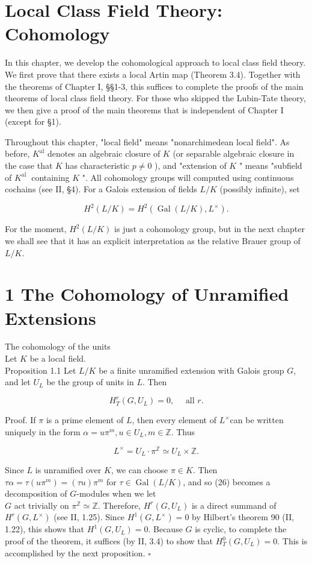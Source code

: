 \documentclass[10pt]{article}
\begin{document}
\section*{Local Class Field Theory: Cohomology}
In this chapter, we develop the cohomological approach to local class field theory. We first prove that there exists a local Artin map (Theorem 3.4). Together with the theorems of Chapter I, §§1-3, this suffices to complete the proofs of the main theorems of local class field theory. For those who skipped the Lubin-Tate theory, we then give a proof of the main theorems that is independent of Chapter I (except for §1).

Throughout this chapter, "local field" means "nonarchimedean local field". As before, $K^{\mathrm{al}}$ denotes an algebraic closure of $K$ (or separable algebraic closure in the case that $K$ has characteristic $p \neq 0$ ), and "extension of $K$ " means "subfield of $K^{\text {al }}$ containing $K$ ". All cohomology groups will computed using continuous cochains (see II, §4). For a Galois extension of fields $L / K$ (possibly infinite), set

$$
H^{2}(L / K)=H^{2}\left(\operatorname{Gal}(L / K), L^{\times}\right) .
$$

For the moment, $H^{2}(L / K)$ is just a cohomology group, but in the next chapter we shall see that it has an explicit interpretation as the relative Brauer group of $L / K$.

\section*{1 The Cohomology of Unramified Extensions}
The cohomology of the units\\
Let $K$ be a local field.\\
Proposition 1.1 Let $L / K$ be a finite unramified extension with Galois group $G$, and let $U_{L}$ be the group of units in $L$. Then

$$
H_{T}^{r}\left(G, U_{L}\right)=0, \quad \text { all } r .
$$

Proof. If $\pi$ is a prime element of $L$, then every element of $L^{\times}$can be written uniquely in the form $\alpha=u \pi^{m}, u \in U_{L}, m \in \mathbb{Z}$. Thus


\begin{equation*}
L^{\times}=U_{L} \cdot \pi^{\mathbb{Z}} \simeq U_{L} \times \mathbb{Z} . \tag{26}
\end{equation*}


Since $L$ is unramified over $K$, we can choose $\pi \in K$. Then $\tau \alpha=\tau\left(u \pi^{m}\right)=(\tau u) \pi^{m}$ for $\tau \in \operatorname{Gal}(L / K)$, and so (26) becomes a decomposition of $G$-modules when we let\\
$G$ act trivially on $\pi^{\mathbb{Z}} \simeq \mathbb{Z}$. Therefore, $H^{r}\left(G, U_{L}\right)$ is a direct summand of $H^{r}\left(G, L^{\times}\right)$ (see II, 1.25). Since $H^{1}\left(G, L^{\times}\right)=0$ by Hilbert's theorem 90 (II, 1.22), this shows that $H^{1}\left(G, U_{L}\right)=0$. Because $G$ is cyclic, to complete the proof of the theorem, it suffices (by II, 3.4) to show that $H_{T}^{0}\left(G, U_{L}\right)=0$. This is accomplished by the next proposition. \(\square\)
\end{document}
